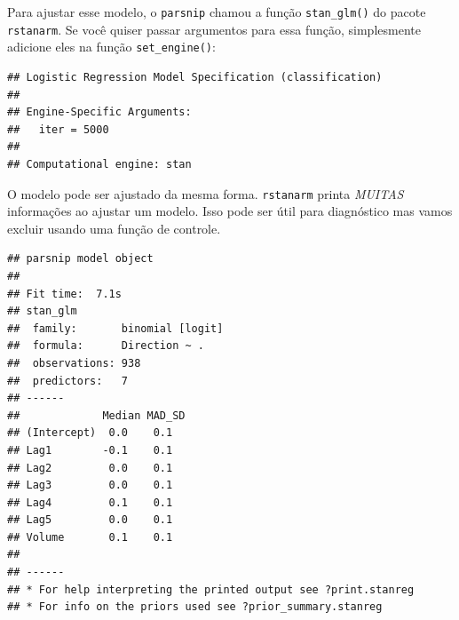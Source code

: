 \documentclass[
]{article}
\newenvironment{Shaded}{\begin{snugshade}}{\end{snugshade}}
\newcommand{\DataTypeTok}[1]{\textcolor[rgb]{0.13,0.29,0.53}{#1}}
\newcommand{\DecValTok}[1]{\textcolor[rgb]{0.00,0.00,0.81}{#1}}
\newcommand{\KeywordTok}[1]{\textcolor[rgb]{0.13,0.29,0.53}{\textbf{#1}}}
\newcommand{\NormalTok}[1]{#1}
\newcommand{\OperatorTok}[1]{\textcolor[rgb]{0.81,0.36,0.00}{\textbf{#1}}}
\newcommand{\StringTok}[1]{\textcolor[rgb]{0.31,0.60,0.02}{#1}}
\begin{document}
Para ajustar esse modelo, o \texttt{parsnip} chamou a função
\texttt{stan\_glm()} do pacote \texttt{rstanarm}. Se você quiser passar
argumentos para essa função, simplesmente adicione eles na função
\texttt{set\_engine()}:

\begin{Shaded}
\end{Shaded}

\begin{verbatim}
## Logistic Regression Model Specification (classification)
## 
## Engine-Specific Arguments:
##   iter = 5000
## 
## Computational engine: stan
\end{verbatim}

O modelo pode ser ajustado da mesma forma. \texttt{rstanarm} printa
\emph{MUITAS} informações ao ajustar um modelo. Isso pode ser útil para
diagnóstico mas vamos excluir usando uma função de controle.

\begin{Shaded}
\end{Shaded}

\begin{verbatim}
## parsnip model object
## 
## Fit time:  7.1s 
## stan_glm
##  family:       binomial [logit]
##  formula:      Direction ~ .
##  observations: 938
##  predictors:   7
## ------
##             Median MAD_SD
## (Intercept)  0.0    0.1  
## Lag1        -0.1    0.1  
## Lag2         0.0    0.1  
## Lag3         0.0    0.1  
## Lag4         0.1    0.1  
## Lag5         0.0    0.1  
## Volume       0.1    0.1  
## 
## ------
## * For help interpreting the printed output see ?print.stanreg
## * For info on the priors used see ?prior_summary.stanreg
\end{verbatim}
\end{document}
